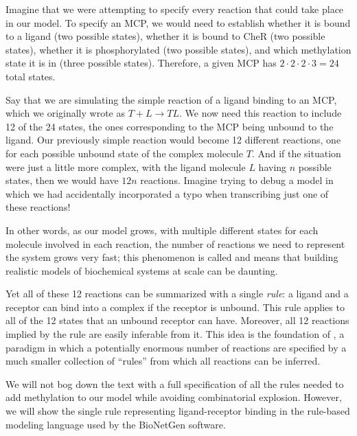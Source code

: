 Imagine that we were attempting to specify every reaction that could take place in our model. To specify an MCP, we would need to establish whether it is bound to a ligand (two possible states), whether it is bound to CheR (two possible states), whether it is phosphorylated (two possible states), and which methylation state it is in (three possible states). Therefore, a given MCP has $2 \cdot 2 \cdot 2 \cdot 3 = 24$ total states.

Say that we are simulating the simple reaction of a ligand binding to an MCP, which we originally wrote as $T + L \rightarrow TL$. We now need this reaction to include 12 of the 24 states, the ones corresponding to the MCP being unbound to the ligand. Our previously simple reaction would become 12 different reactions, one for each possible unbound state of the complex molecule $T$. And if the situation were just a little more complex, with the ligand molecule $L$ having $n$ possible states, then we would have $12n$ reactions. Imagine trying to debug a model in which we had accidentally incorporated a typo when transcribing just one of these reactions!

In other words, as our model grows, with multiple different states for each molecule involved in each reaction, the number of reactions we need to represent the system grows very fast; this phenomenon is called  and means that building realistic models of biochemical systems at scale can be daunting.

Yet all of these 12 reactions can be summarized with a single \textit{rule}: a ligand and a receptor can bind into a complex if the receptor is unbound. This rule applies to all of the 12 states that an unbound receptor can have. Moreover, all 12 reactions implied by the rule are easily inferable from it. This idea is the foundation of , a paradigm in which a potentially enormous number of reactions are specified by a much smaller collection of ``rules'' from which all reactions can be inferred. 

We will not bog down the text with a full specification of all the rules needed to add methylation to our model while avoiding combinatorial explosion. However, we will show the single rule representing ligand-receptor binding in the rule-based modeling language used by the BioNetGen software.\\

